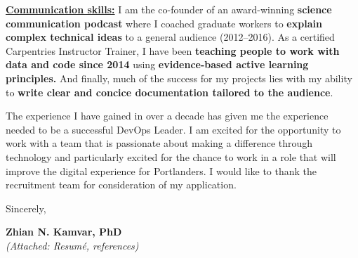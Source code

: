 
\vspace{2ex}

\underline{\textbf{Communication skills:}}
I am the co-founder of an award-winning \textbf{science communication podcast} where I coached graduate workers to \textbf{explain complex technical ideas} to a general audience (2012--2016).
As a certified Carpentries Instructor Trainer, I have been \textbf{teaching people to work with data and code since 2014} using \textbf{evidence-based active learning principles.} 
And finally, much of the success for my projects lies with my ability to \textbf{write clear and concice documentation tailored to the audience}.


\vspace{2ex}
The experience I have gained in over a decade has given me the experience needed to be a successful DevOps Leader. 
I am excited for the opportunity to work with a team that is passionate about making a difference through technology
and particularly excited for the chance to work in a role that will improve the digital experience for Portlanders.
I would like to thank the recruitment team for consideration of my application.

\vspace{3ex}

Sincerely,

\vspace{4ex}

\textbf{Zhian N. Kamvar, PhD}\\
{\footnotesize \textit{(Attached: Resum\'{e}, references)}}

\clearpage



